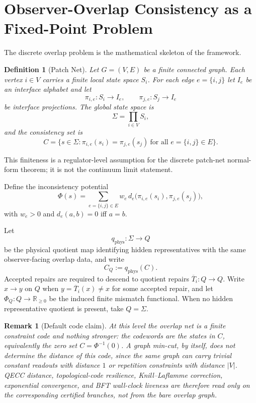\documentclass[11pt]{article}
\newtheorem{definition}[theorem]{Definition}
\newtheorem{remark}[theorem]{Remark}
\begin{document}
\section{Observer-Overlap Consistency as a Fixed-Point Problem}

The discrete overlap problem is the mathematical skeleton of the framework.

\begin{definition}[Patch Net]\label{def:patchnet}
Let $G=(V,E)$ be a finite connected graph. Each vertex $i\in V$ carries a finite local state space $S_i$. For each edge $e=\{i,j\}$ let $I_e$ be an interface alphabet and let
\[
\pi_{i,e}:S_i\to I_e,
\qquad
\pi_{j,e}:S_j\to I_e
\]
be interface projections. The global state space is
\[
\Sigma=\prod_{i\in V} S_i,
\]
and the consistency set is
\[
C=\bigl\{s\in\Sigma:\pi_{i,e}(s_i)=\pi_{j,e}(s_j)\ \text{for all }e=\{i,j\}\in E\bigr\}.
\]
\end{definition}

This finiteness is a regulator-level assumption for the discrete patch-net normal-form theorem; it is not the continuum limit statement.

Define the inconsistency potential
\[
\Phi(s)=\sum_{e=\{i,j\}\in E}w_e\, d_e\!\bigl(\pi_{i,e}(s_i),\pi_{j,e}(s_j)\bigr),
\]
with $w_e>0$ and $d_e(a,b)=0$ iff $a=b$.

Let
\[
q_{\mathrm{phys}}:\Sigma\to Q
\]
be the physical quotient map identifying hidden representatives with the same observer-facing
overlap data, and write
\[
C_Q:=q_{\mathrm{phys}}(C).
\]
Accepted repairs are required to descend to quotient repairs \(\overline T_i:Q\to Q\). Write
\(x\to y\) on \(Q\) when \(y=\overline T_i(x)\ne x\) for some accepted repair, and let
\(\Phi_Q:Q\to\mathbb R_{\ge0}\) be the induced finite mismatch functional. When no hidden
representative quotient is present, take \(Q=\Sigma\).

\begin{remark}[Default code claim]\label{rem:constraint-code-firewall}
At this level the overlap net is a finite constraint code and nothing stronger: the codewords are
the states in \(C\), equivalently the zero set \(C=\Phi^{-1}(0)\). A graph min-cut, by itself,
does not determine the distance of this code, since the same graph can carry trivial constant
readouts with distance \(1\) or repetition constraints with distance \(|V|\). QECC distance,
topological-code resilience, Knill--Laflamme correction, exponential convergence, and BFT
wall-clock liveness are therefore read only on the corresponding certified branches, not from the
bare overlap graph.
\end{remark}
\end{document}
